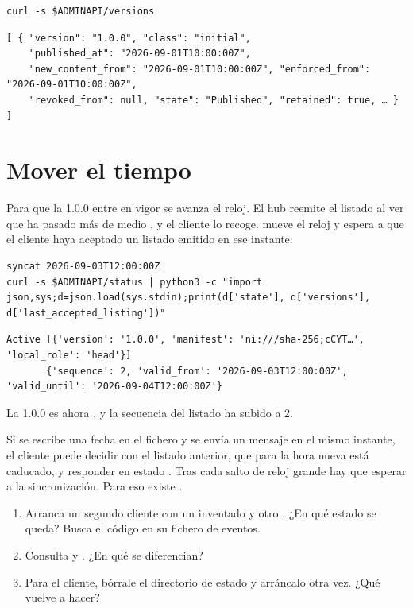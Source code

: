 \begin{lstlisting}[style=sh]
curl -s $ADMINAPI/versions
\end{lstlisting}
\begin{lstlisting}[style=out]
[ { "version": "1.0.0", "class": "initial",
    "published_at": "2026-09-01T10:00:00Z",
    "new_content_from": "2026-09-01T10:00:00Z", "enforced_from": "2026-09-01T10:00:00Z",
    "revoked_from": null, "state": "Published", "retained": true, … } ]
\end{lstlisting}

\section{Mover el tiempo}

Para que la 1.0.0 entre en vigor se avanza el reloj. El hub reemite el listado al ver que ha pasado más de medio
, y el cliente lo recoge.  mueve el reloj y espera a que el cliente haya aceptado un
listado emitido en ese instante:

\begin{lstlisting}[style=sh]
syncat 2026-09-03T12:00:00Z
curl -s $ADMINAPI/status | python3 -c "import json,sys;d=json.load(sys.stdin);print(d['state'], d['versions'], d['last_accepted_listing'])"
\end{lstlisting}
\begin{lstlisting}[style=out]
Active [{'version': '1.0.0', 'manifest': 'ni:///sha-256;cCYT…', 'local_role': 'head'}]
       {'sequence': 2, 'valid_from': '2026-09-03T12:00:00Z', 'valid_until': '2026-09-04T12:00:00Z'}
\end{lstlisting}

La 1.0.0 es ahora , y la secuencia del listado ha subido a 2.

\begin{trampaHabitual}
Si se escribe una fecha en el fichero y se envía un mensaje en el mismo instante, el cliente puede decidir con
el listado anterior, que para la hora nueva está caducado, y responder en estado . Tras cada salto
de reloj grande hay que esperar a la sincronización. Para eso existe .
\end{trampaHabitual}

\begin{retos}
\begin{enumerate}[leftmargin=*, itemsep=2pt]
  \item Arranca un segundo cliente con un  inventado y otro . ¿En qué estado se
        queda? Busca el código en su fichero de eventos.
  \item Consulta  y . ¿En qué se diferencian?
  \item Para el cliente, bórrale el directorio de estado y arráncalo otra vez. ¿Qué vuelve a hacer?
\end{enumerate}
\end{retos}
